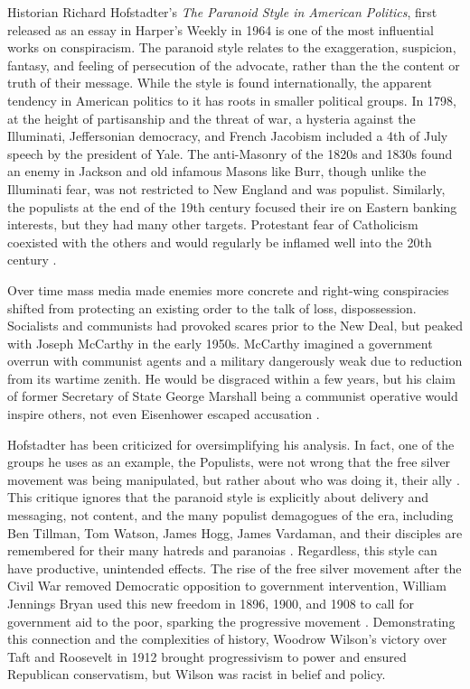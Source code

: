 Historian Richard Hofstadter's \emph{The Paranoid Style in American Politics}, first released as an essay in Harper's Weekly in 1964 is one of the most influential works on conspiracism.
The paranoid style relates to the exaggeration, suspicion, fantasy, and feeling of persecution of the advocate, rather than the the content or truth of their message. 
While the style is found internationally, the apparent tendency in American politics to it has roots in smaller political groups. 
In 1798, at the height of partisanship and the threat of war, a hysteria against the Illuminati, Jeffersonian democracy, and French Jacobism included a 4th of July speech by the president of Yale.
The anti-Masonry of the 1820s and 1830s found an enemy in Jackson and old infamous Masons like Burr, though unlike the Illuminati fear, was not restricted to New England and was populist. 
Similarly, the populists at the end of the 19th century focused their ire on Eastern banking interests, but they had many other targets.
Protestant fear of Catholicism coexisted with the others and would regularly be inflamed well into the 20th century \cite{hofstadter2012}.

Over time mass media made enemies more concrete and right-wing conspiracies shifted from protecting an existing order to the talk of loss, dispossession. 
Socialists and communists had provoked scares prior to the New Deal, but peaked with Joseph McCarthy in the early 1950s.
McCarthy imagined a government overrun with communist agents and a military dangerously weak due to reduction from its wartime zenith.
He would be disgraced within a few years, but his claim of former Secretary of State George Marshall being a communist operative would inspire others, not even Eisenhower escaped accusation \cite{hofstadter2012}.

Hofstadter has been criticized for oversimplifying his analysis.
In fact, one of the groups he uses as an example, the Populists, were not wrong that the free silver movement was being manipulated, but rather about who was doing it, their ally \cite[pp. 3-4]{decanio2011}.
This critique ignores that the paranoid style is explicitly about delivery and messaging, not content, and the many populist demagogues of the era, including Ben Tillman, Tom Watson, James Hogg, James Vardaman, and their disciples are remembered for their many hatreds and paranoias \cite[pp. 44-45]{luthin1951}.
Regardless, this style can have productive, unintended effects. 
The rise of the free silver movement after the Civil War removed Democratic opposition to government intervention, William Jennings Bryan used this new freedom in 1896, 1900, and 1908 to call for government aid to the poor, sparking the progressive movement \cite[pp. 22-23]{decanio2011}.
Demonstrating this connection and the complexities of history, Woodrow Wilson's victory over Taft and Roosevelt in 1912 brought progressivism to power and ensured Republican conservatism, but Wilson was racist in belief and policy.

